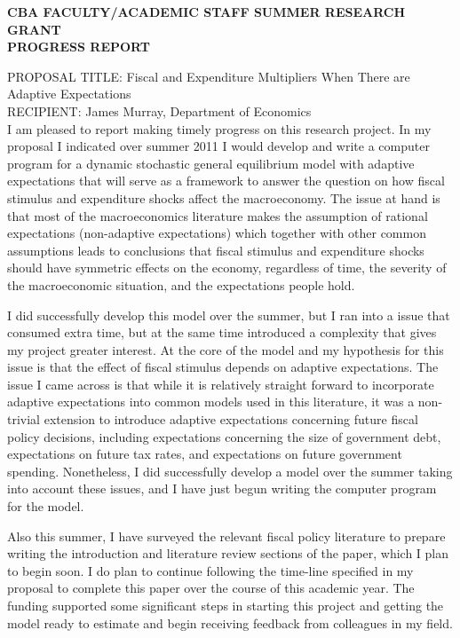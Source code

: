 \documentclass[12pt]{article}
\begin{document}
\thispagestyle{empty}
\begin{center}
\textbf{CBA FACULTY/ACADEMIC STAFF SUMMER RESEARCH GRANT}\\
\textbf{PROGRESS REPORT}\\
\end{center}

\noindent PROPOSAL TITLE: Fiscal and Expenditure Multipliers When There are Adaptive Expectations\\
RECIPIENT: James Murray, Department of Economics\\

I am pleased to report making timely progress on this research project.  In my proposal I indicated over summer 2011 I would develop and write a computer program for a dynamic stochastic general equilibrium model with adaptive expectations that will serve as a framework to answer the question on how fiscal stimulus and expenditure shocks affect the macroeconomy.  The issue at hand is that most of the macroeconomics literature makes the assumption of rational expectations (non-adaptive expectations) which together with other common assumptions leads to conclusions that fiscal stimulus and expenditure shocks should have symmetric effects on the economy, regardless of time, the severity of the macroeconomic situation, and the expectations people hold.  

I did successfully develop this model over the summer, but I ran into a issue that consumed extra time, but at the same time introduced a complexity that gives my project greater interest.  At the core of the model and my hypothesis for this issue is that the effect of fiscal stimulus depends on adaptive expectations.  The issue I came across is that while it is relatively straight forward to incorporate adaptive expectations into common models used in this literature, it was a non-trivial extension to introduce adaptive expectations concerning future fiscal policy decisions, including expectations concerning the size of government debt, expectations on future tax rates, and expectations on future government spending.  Nonetheless, I did successfully develop a model over the summer taking into account these issues, and I have just begun writing the computer program for the model. 

Also this summer, I have surveyed the relevant fiscal policy literature to prepare writing the introduction and literature review sections of the paper, which I plan to begin soon.  I do plan to continue following the time-line specified in my proposal to complete this paper over the course of this academic year.  The funding supported some significant steps in starting this project and getting the model ready to estimate and begin receiving feedback from colleagues in my field.
  
\end{document}

